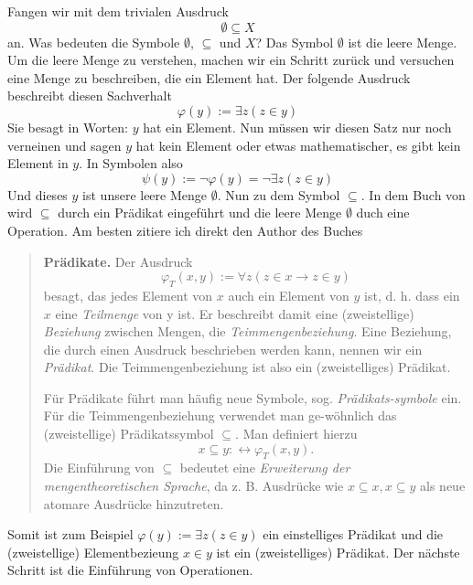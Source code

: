 \documentclass[11pt, a4paper]{article}
\begin{document}
\noindent
Fangen wir mit dem trivialen Ausdruck \[ \emptyset \subseteq X \] an. Was
bedeuten die Symbole $\emptyset$, $\subseteq$ und $X$? Das Symbol $\emptyset$
ist die leere Menge. Um die leere Menge zu verstehen, machen wir ein Schritt
zurück und versuchen eine Menge zu beschreiben, die ein Element hat. Der
folgende Ausdruck beschreibt diesen Sachverhalt
\[
    \varphi(y) := \exists z(z\in y)
\]
Sie besagt in Worten: $y$ hat ein Element. Nun müssen wir diesen Satz nur noch
verneinen und sagen $y$ hat kein Element oder etwas mathematischer, es gibt kein
Element in $y$. In Symbolen also
\[
    \psi(y) :=\lnot\varphi(y) = \lnot\exists z(z\in y)
\]
Und dieses $y$ ist unsere leere Menge $\emptyset$. Nun zu dem Symbol
$\subseteq$. In dem Buch von \cite{Ebbinghaus2003} wird $\subseteq$ durch
ein Prädikat eingeführt und die leere Menge $\emptyset$ duch eine
Operation. Am besten zitiere ich direkt den Author des Buches
\begin{quote}
    \textbf{Prädikate.} Der Ausdruck
    \[
        \varphi_T(x,y):=\forall z(z\in x \rightarrow z\in y)
    \]
    besagt, das jedes Element von $x$ auch ein Element von $y$ ist, d. h. dass
    ein $x$ eine \textit{Teilmenge} von y ist. Er beschreibt damit eine
    (zweistellige) \textit{Beziehung} zwischen Mengen, die
    \textit{Teimmengenbeziehung}. Eine Beziehung, die durch einen Ausdruck
    beschrieben werden kann, nennen wir ein \textit{Prädikat}. Die
    Teimmengenbeziehung ist also ein (zweistelliges) Prädikat.

    Für Prädikate führt man häufig neue Symbole, sog.
    \textit{Prädikats-symbole} ein. Für die Teimmengenbeziehung verwendet man
    ge-wöhnlich das (zweistellige) Prädikatssymbol $\subseteq$. Man definiert
    hierzu
    \[
        x \subseteq y :\leftrightarrow \varphi_T(x,y).
    \]
    Die Einführung von $\subseteq$ bedeutet eine \textit{Erweiterung der
    mengentheoretischen Sprache}, da z. B. Ausdrücke wie $x \subseteq x,
    x\subseteq y$ als neue atomare Ausdrücke hinzutreten.
\end{quote}
Somit ist zum Beispiel $\varphi(y) := \exists z(z\in y)$ ein einstelliges
Prädikat und die (zweistellige) Elementbezieung $x\in y$ ist ein
(zweistelliges) Prädikat. Der nächste Schritt ist die Einführung von
Operationen.
\end{document}
